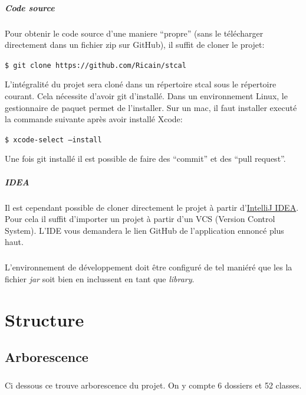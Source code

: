 \documentclass[a4paper,10pt]{report}
\newcommand{\code}[1]{\texttt{#1}}
\begin{document}
			\paragraph[Code source]{Code source}
			Pour obtenir le code source d'une maniere ``propre'' (sans le télécharger directement dans un fichier zip sur GitHub), il suffit de cloner le projet:

			\code{\$ git clone https://github.com/Ricain/stcal}

			L'intégralité du projet sera cloné dans un répertoire stcal sous le répertoire courant. Cela nécessite d'avoir git d'installé. Dans un environnement Linux, le gestionnaire de paquet permet de l'installer. Sur un mac, il faut installer executé la commande suivante après avoir installé Xcode:

			\code{\$ xcode-select --install}

			Une fois git installé il est possible de faire des ``commit'' et des ``pull request''.

			\paragraph[IDEA]{IDEA}
			Il est cependant possible de cloner directement le projet à partir d'\href{http://www.jetbrains.com/idea/}{IntelliJ IDEA}. Pour cela il suffit d'importer un projet à partir d'un VCS (Version Control System). L'IDE vous demandera le lien GitHub de l'application ennoncé plus haut.

			\paragraph*{}
			L’environnement de développement doit être configuré de tel maniéré que les la fichier \textit{jar} soit bien en inclussent en tant que \textit{library}.

\chapter{Structure}

	\section{Arborescence}

	\paragraph*{}
	Ci dessous ce trouve arborescence du projet. On y compte 6 dossiers et 52 classes.
\end{document}

